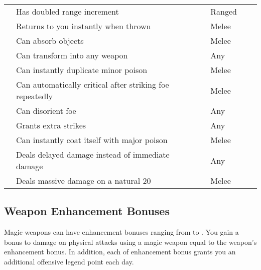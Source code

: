 \begin{longtabuwrapper}
\begin{longtabu}{l X l l l l}
                 & Has doubled range increment &  & Ranged &  \\
                 & Returns to you instantly when thrown &  & Melee &  \\
                 & Can absorb objects &  & Melee &  \\
                 & Can transform into any weapon &  & Any &  \\
                 & Can instantly duplicate minor poison &  & Melee &  \\
                 & Can automatically critical after striking foe repeatedly &  & Melee &  \\
                 & Can disorient foe &  & Any &  \\
                 & Grants extra strikes &  & Any &  \\
                 & Can instantly coat itself with major poison &  & Melee &  \\
                 & Deals delayed damage instead of immediate damage &  & Any &  \\
                 & Deals massive damage on a natural 20 &  & Melee &  \\
            \end{longtabu}
        \end{longtabuwrapper}
        \twocolumn

    \subsection{Weapon Enhancement Bonuses}\label{Weapon Enhancement Bonuses}

        Magic weapons can have enhancement bonuses ranging from  to .
        You gain a bonus to damage on physical attacks using a magic weapon equal to the weapon's enhancement bonus.
        In addition, each  of enhancement bonus grants you an additional offensive legend point each day.

